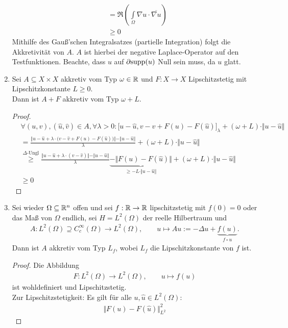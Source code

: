 \begin{beispiel}
\begin{enumerate}[label=(\alph*)]
\begin{align*}
&=\Re\left(\int\limits_{\Omega} \nabla u\cdot\overline{\nabla u}\right)\\
&\geq0
\end{align*}
Mithilfe des Gauß'schen Integralsatzes (partielle Integration) folgt die Akkretivität von $A$. $A$ ist hierbei der negative Laplace-Operator auf den Testfunktionen.
Beachte, dass $u$ auf $\partial \text{supp}(u)$ Null sein muss, da $u$ glatt.
\item Sei $A\subseteq X\times X$ akkretiv vom Typ $\omega\in\mathbb{R}$ und $F:X\to X$ Lipschitzstetig mit Lipschitzkonstante $L\geq0$.\\
Dann ist $A+F$ akkretiv vom Typ $\omega+L$.
\begin{proof}
\begin{align*}
&\forall (u,v),(\hat{u},\hat{v})\in A,\forall\lambda>0:
\big[u-\hat{u},v-\hat{v}+F(u)-F(\hat{u})\big]_\lambda
+(\omega+L)\cdot\Vert u-\hat{u}\Vert\\
&=\frac{\Big\Vert u-\hat{u}+\lambda\cdot\big(v-\hat{v}+F(u)-F(\hat{u})\big)\Big\Vert-\Vert u-\hat{u}\Vert}{\lambda}
+(\omega+L)\cdot\Vert u-\hat{u}\Vert\\
&\stackrel{\Delta\text{-Ungl}}{\geq}
\frac{\big\Vert u-\hat{u}+\lambda\cdot(v-\hat{v})\big\Vert-\Vert u-\hat{u}\Vert}{\lambda}\underbrace{-\big\Vert F(u)-F(\hat{u})\big\Vert}_{\geq -L\cdot\Vert u-\hat{u}\Vert}
+(\omega+L)\cdot\Vert u-\hat{u}\Vert\\
&\geq0
\end{align*}
\end{proof}
\item Sei wieder $\Omega\subseteq\mathbb{R}^n$ offen und sei $f:\mathbb{R}\to\mathbb{R}$ lipschitzstetig mit $f(0)=0$ oder das Maß von $\Omega$ endlich, sei $H=L^2(\Omega)$ der reelle Hilbertraum und
\begin{align*}
A:L^2(\Omega)\supseteq C_c^\infty(\Omega)\to L^2(\Omega),\qquad
u\mapsto Au:=-\Delta u+\underbrace{f(u)}_{f\circ u}.
\end{align*}
Dann ist $A$ akkretiv vom Typ $L_f$, wobei $L_f$ die Lipschitzkonstante von $f$ ist.
\begin{proof}
Die Abbildung
\begin{align*}
F: L^2(\Omega)\to L^2(\Omega),\qquad u\mapsto f(u)
\end{align*}
ist wohldefiniert und Lipschitzstetig.\\
Zur Lipschitzstetigkeit: Es gilt für alle $u,\hat{u}\in L^2(\Omega)$:
\begin{align*}
\big\Vert F(u)-F(\hat{u})\big\Vert^2_{L^2}

\end{align*}
\end{proof}
\end{enumerate}
\end{beispiel}
